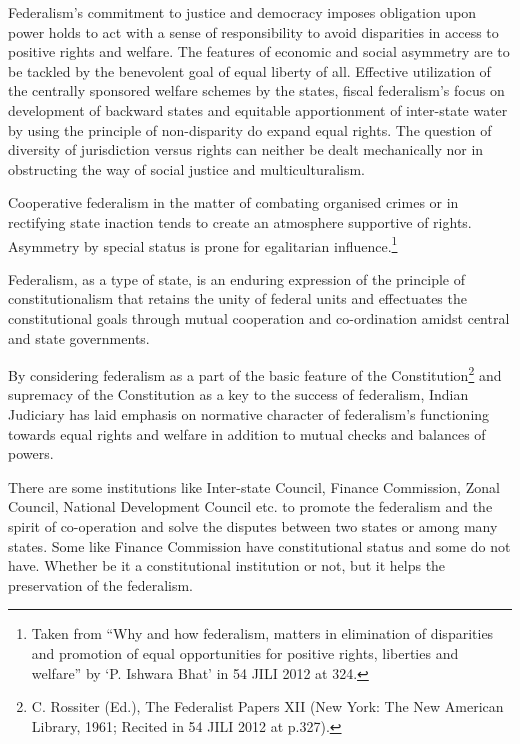 \begin{multicols}{2}
\vspace{-.12cm}

\noi
Federalism's commitment to justice and democracy imposes obligation upon power holds to act
with a sense of responsibility to avoid disparities in access to positive rights and welfare. The
features of economic and social asymmetry are to be tackled by the benevolent goal of equal
liberty of all. Effective utilization of the centrally sponsored welfare schemes by the states, fiscal
federalism's focus on development of backward states and equitable apportionment of inter-state
water by using the principle of non-disparity do expand equal rights. The question of diversity of
jurisdiction versus rights can neither be dealt mechanically nor in obstructing the way of social
justice and multiculturalism.

\vspace{-.12cm}

\noi
Cooperative federalism in the matter of combating organised crimes or in rectifying state inaction
tends to create an atmosphere supportive of rights. Asymmetry by special status is prone for
egalitarian influence.\footnote{Taken from “Why and how federalism, matters in elimination of disparities and promotion of equal opportunities for positive rights, liberties and welfare” by ‘P. Ishwara Bhat’ in 54 JILI 2012 at 324.}

\vspace{-.12cm}

\noi
Federalism, as a type of state, is an enduring expression of the principle of constitutionalism that
retains the unity of federal units and effectuates the constitutional goals through mutual cooperation and co-ordination amidst central and state governments.

\vspace{-.1cm}

\noi
By considering federalism as a part of the basic feature of the Constitution\footnote{C. Rossiter (Ed.), The Federalist Papers XII (New York: The New American Library, 1961; Recited in 54 JILI 2012 at p.327).} and supremacy of the Constitution as a key to the success of federalism, Indian Judiciary has laid emphasis on normative character of federalism's functioning towards equal rights and welfare in addition to mutual checks and balances of powers.

\vspace{-.1cm}

\noi
There are some institutions like Inter-state Council, Finance Commission, Zonal Council,
National Development Council etc. to promote the federalism and the spirit of co-operation and
solve the disputes between two states or among many states. Some like Finance Commission have
constitutional status and some do not have. Whether be it a constitutional institution or not, but it
helps the preservation of the federalism.


\end{multicols}
